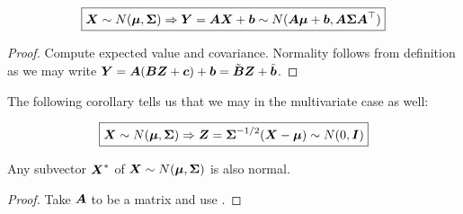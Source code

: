 \begin{theorem}
    \label{thm:lin_comb}
    \begin{equation}
        \boxed{
            \boldsymbol{X} 
            \sim N(\boldsymbol{\mu}, \boldsymbol{\Sigma}) \Rightarrow 
            \boldsymbol{Y} = 
            \boldsymbol{A}\boldsymbol{X}+\boldsymbol{b} 
            \sim N(\boldsymbol{A}\boldsymbol{\mu}+ \boldsymbol{b}, \boldsymbol{A} \boldsymbol{\Sigma} \boldsymbol{A}^\top)
        }        
    \end{equation}
\end{theorem}
\begin{proof}
    Compute expected value and covariance. Normality follows from definition as we may write $\boldsymbol{Y} = \boldsymbol{A}(\boldsymbol{B} \boldsymbol{Z} + \boldsymbol{c}) + \boldsymbol{b} = \tilde{\boldsymbol{B}} \boldsymbol{Z} + \tilde{\boldsymbol{b}}$. 
\end{proof}
The following corollary tells us that we may  in the multivariate case as well:
\begin{corollary}
    \begin{equation}
        \boxed{
            \boldsymbol{X} 
            \sim N(\boldsymbol{\mu}, \boldsymbol{\Sigma}) \Rightarrow 
            \boldsymbol{Z} = 
            \boldsymbol{\Sigma}^{-1/2}(\boldsymbol{X}-\boldsymbol{\mu}) 
            \sim N(0, \boldsymbol{I})
        }        
    \end{equation}
\end{corollary}
\begin{corollary}
    Any subvector $\boldsymbol{X}^*$ of $\boldsymbol{X}\sim N(\boldsymbol{\mu}, \boldsymbol{\Sigma})$ is also normal.
\end{corollary}
\begin{proof}
    Take $\boldsymbol{A}$ to be a  matrix and use . 
\end{proof}

